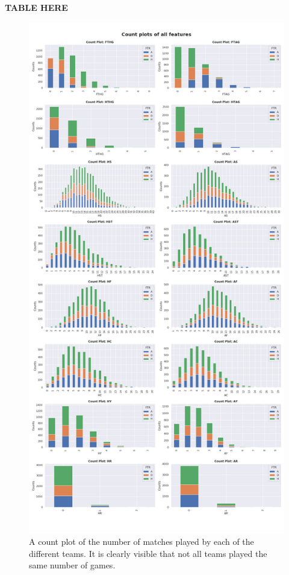 \documentclass[a4paper,12pt]{article}
\begin{document}
		\textbf{TABLE HERE}
		
		\begin{figure}[h]
			\renewcommand\thefigure{2.1}
			\centering
			
			\includegraphics[scale=0.3]{count_plot_all.png}
			\caption{A count plot of the number of matches played by each of the different teams. It is clearly visible that not all teams played the same number of games.}
		\end{figure}
		
\end{document}
